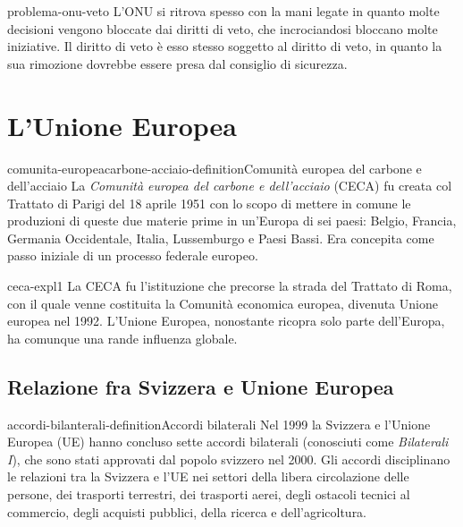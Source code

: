 \documentclass[preview]{standalone}
\begin{document}
\begin{snippet}{problema-onu-veto}
    L'ONU si ritrova spesso con la mani legate in quanto
    molte decisioni vengono bloccate dai diritti di veto, che incrociandosi
    bloccano molte iniziative.
    Il diritto di veto è esso stesso soggetto al diritto di veto, in quanto
    la sua rimozione dovrebbe essere presa dal consiglio di sicurezza.
\end{snippet}

\section{L'Unione Europea}

\begin{snippetdefinition}{comunita-europeacarbone-acciaio-definition}{Comunità europea del carbone e dell'acciaio}
    La \textit{Comunità europea del carbone e dell'acciaio} (CECA)
    fu creata col Trattato di Parigi del 18 aprile 1951
    con lo scopo di mettere in comune le produzioni di queste due materie prime in un'Europa
    di sei paesi: Belgio, Francia, Germania Occidentale, Italia, Lussemburgo e Paesi Bassi.
    Era concepita come passo iniziale di un processo federale europeo.
\end{snippetdefinition}

\begin{snippet}{ceca-expl1}
    La CECA fu l'istituzione che precorse
    la strada del Trattato di Roma, con il quale venne
    costituita la Comunità economica europea, divenuta Unione europea nel 1992.
    L'Unione Europea, nonostante ricopra solo parte dell'Europa, ha comunque una rande influenza globale.
\end{snippet}


\subsection{Relazione fra Svizzera e Unione Europea}

\begin{snippetdefinition}{accordi-bilanterali-definition}{Accordi bilaterali}
    Nel 1999 la Svizzera e l'Unione Europea (UE) hanno concluso sette accordi
    bilaterali (conosciuti come \textit{Bilaterali I}),
    che sono stati approvati dal popolo svizzero nel 2000.
    Gli accordi disciplinano le relazioni tra la Svizzera e l'UE nei settori
    della libera circolazione delle persone,
    dei trasporti terrestri, dei trasporti aerei, degli
    ostacoli tecnici al commercio, degli acquisti pubblici,
    della ricerca e dell'agricoltura.
\end{snippetdefinition}
\end{document}
